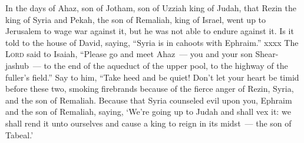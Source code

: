 
\begin{inparaenum}
     In the days of Ahaz, son of Jotham, son of Uzziah king of Judah, that Rezin the king of Syria and Pekah, the son of Remaliah, king of Israel, went up to Jerusalem to wage war against it, but he was not able to endure against it.%
     Is it told to the house of David, saying, ``Syria is in cahoots with Ephraim.'' xxxx%
     The \textsc{Lord} said to Isaiah, ``Please go and meet Ahaz~--- you and your son Shear-jashub~--- to the end of the aqueduct of the upper pool, to the highway of the fuller's field.''%
     Say to him, ``Take heed and be quiet! Don't let your heart be timid before these two, smoking firebrands because of the fierce anger of Rezin, Syria, and the son of Remaliah.%
     Because that Syria counseled evil upon you, Ephraim and the son of Remaliah, saying,%
     `We're going up to Judah and shall vex it: we shall rend it unto ourselves and cause a king to reign in its midst~--- the son of Tabeal.'\smallskip%
    
    
    
    
    
    

\end{inparaenum}
